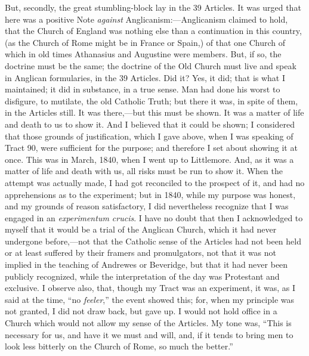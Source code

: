 But, secondly, the great stumbling-block lay in the 39 Articles. It
was urged that here was a positive Note \emph{against}
Anglicanism:—Anglicanism claimed to hold, that the Church of England was
nothing else than a continuation in this country, (as the Church of Rome
might be in France or Spain,) of that one Church of which in old times
Athanasius and Augustine were members. But, if so, the doctrine must be
the same; the doctrine of the Old Church must live and speak in Anglican
formularies, in the 39 Articles. Did it? Yes, it did; that is what I
maintained; it did in substance, in a true sense. Man had done his worst
to disfigure, to mutilate, the old Catholic Truth; but there it was, in
spite of them, in the Articles still. It was there,—but this
must be shown. It was a matter of life and death to us to show it. And I
believed that it could be shown; I considered that those grounds of
justification, which I gave above, when I was speaking of Tract 90, were
sufficient for the purpose; and therefore I set about showing it at
once. This was in March, 1840, when I went up to Littlemore. And, as it
was a matter of life and death with us, all risks must be run to show
it. When the attempt was actually made, I had got reconciled to the
prospect of it, and had no apprehensions as to the experiment; but in
1840, while my purpose was honest, and my grounds of reason
satisfactory, I did nevertheless recognize that I was engaged in
an \emph{experimentum crucis}. I have no doubt that then I acknowledged
to myself that it would be a trial of the Anglican Church, which it had
never undergone before,—not that the Catholic sense of the Articles had
not been held or at least suffered by their framers and promulgators,
not that it was not implied in the teaching of Andrewes or Beveridge,
but that it had never been publicly recognized, while the interpretation
of the day was Protestant and exclusive. I observe also, that, though my
Tract was an experiment, it was, as I said at the time, ``no \emph{feeler},''
the event showed this; for, when my principle was not granted, I
did not draw back, but gave up. I would not hold office in a Church
which would not allow my sense of the Articles. My tone was, ``This
is necessary for us, and have it we must and will, and, if it tends to
bring men to look less bitterly on the Church of Rome, so much the
better.''

